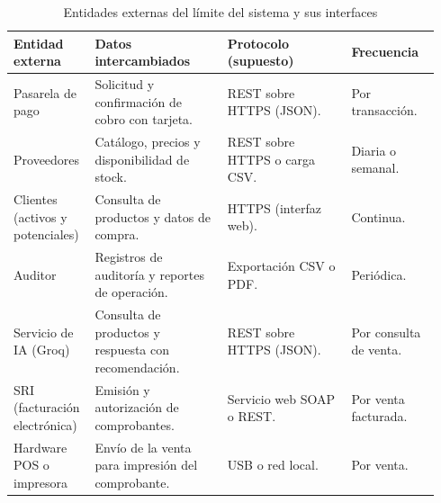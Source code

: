 \documentclass[onecolumn,12pt,a4paper]{IEEEtran}
\begin{document}
\begin{table}[htbp]
\caption{Entidades externas del l\'imite del sistema y sus interfaces}
\label{tab:limite}
\centering
\footnotesize
\begin{tabular}{@{}p{0.16\linewidth}p{0.30\linewidth}p{0.28\linewidth}p{0.20\linewidth}@{}}
\toprule
\textbf{Entidad externa} & \textbf{Datos intercambiados} & \textbf{Protocolo (supuesto)} & \textbf{Frecuencia}\\
\midrule
Pasarela de pago & Solicitud y confirmaci\'on de cobro con tarjeta. & REST sobre HTTPS (JSON). & Por transacci\'on.\\
Proveedores & Cat\'alogo, precios y disponibilidad de stock. & REST sobre HTTPS o carga CSV. & Diaria o semanal.\\
Clientes (activos y potenciales) & Consulta de productos y datos de compra. & HTTPS (interfaz web). & Continua.\\
Auditor & Registros de auditor\'ia y reportes de operaci\'on. & Exportaci\'on CSV o PDF. & Peri\'odica.\\
Servicio de IA (Groq) & Consulta de productos y respuesta con recomendaci\'on. & REST sobre HTTPS (JSON). & Por consulta de venta.\\
SRI (facturaci\'on electr\'onica) & Emisi\'on y autorizaci\'on de comprobantes. & Servicio web SOAP o REST. & Por venta facturada.\\
Hardware POS o impresora & Env\'io de la venta para impresi\'on del comprobante. & USB o red local. & Por venta.\\
\bottomrule
\end{tabular}
\end{table}
\end{document}
